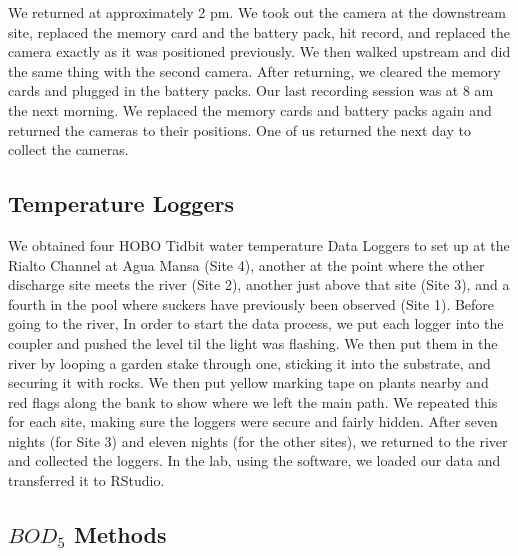\documentclass{article}\usepackage[]{graphicx}\usepackage[]{color}
\begin{document}
We returned at approximately 2 pm.  We took out the camera at the downstream site, replaced the memory card and the battery pack, hit record, and replaced the camera exactly as it was positioned previously.  We then walked upstream and did the same thing with the second camera.  After returning, we cleared the memory cards and plugged in the battery packs.
Our last recording session was at 8 am the next morning.  We replaced the memory cards and battery packs again and returned the cameras to their positions.  One of us returned the next day to collect the cameras.

\subsection{Temperature Loggers}
We obtained four HOBO Tidbit water temperature Data Loggers to set up at the Rialto Channel at Agua Mansa (Site 4), another at the point where the other discharge site meets the river (Site 2), another just above that site (Site 3), and a fourth in the pool where suckers have previously been observed (Site 1). Before going to the river, In order to start the data process, we put each logger into the coupler and pushed the level til the light was flashing. We then put them in the river by looping a garden stake through one, sticking it into the substrate, and securing it with rocks. We then put yellow marking tape on plants nearby and red flags along the bank to show where we left the main path. We repeated this for each site, making sure the loggers were secure and fairly hidden. After seven nights (for Site 3) and eleven nights (for the other sites), we returned to the river and collected the loggers. In the lab, using the software, we loaded our data and transferred it to RStudio.

\subsection{$BOD_5$ Methods}
\end{document}
